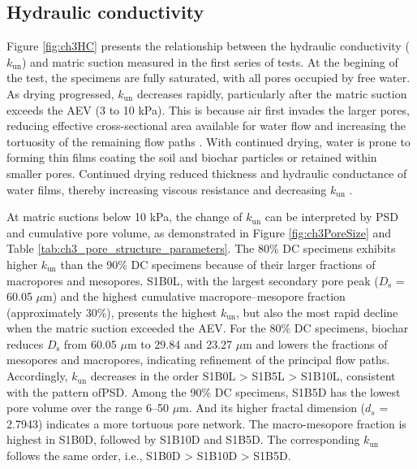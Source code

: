 \subsection{Hydraulic conductivity}
Figure \ref{fig:ch3HC} presents the relationship between the hydraulic conductivity ($k_{\mathrm{un}}$) and matric suction measured in the first series of tests. At the begining of the test, the specimens are fully saturated, with all pores occupied by free water. As drying progressed, $k_{\mathrm{un}}$ decreases rapidly, particularly after the matric suction exceeds the \ac{AEV} (3 to 10 kPa). This is because air first invades the larger pores, reducing effective cross-sectional area available for water flow and increasing the tortuosity of the remaining flow paths \parencite{vangenuchtenClosedformEquationPredicting1980,fredlundPredictingPermeabilityFunction1994}. With continued drying, water is prone to forming thin films coating the soil and biochar particles or retained within smaller pores. Continued drying reduced thickness and hydraulic conductance of water films, thereby increasing viscous resistance and decreasing $k_{\mathrm{un}}$ \parencite{tullerHydraulicConductivityVariably2001}.\par
At matric suctions below 10 kPa, the change of $k_{\mathrm{un}}$ can be interpreted by \ac{PSD} and cumulative pore volume, as demonstrated in Figure \ref{fig:ch3PoreSize} and Table \ref{tab:ch3_pore_structure_parameters}. The 80\% \ac{DC} specimens exhibits higher $k_{\mathrm{un}}$ than the 90\% \ac{DC} specimens because of their larger fractions of macropores and mesopores. S1B0L, with the largest secondary pore peak ($D_{\mathrm{s}}$ = 60.05 $\mu\mathrm{m}$) and the highest cumulative macropore–mesopore fraction (approximately 30\%), presents the highest $k_{\mathrm{un}}$, but also the most rapid decline when the matric suction exceeded the \ac{AEV}. For the 80\% \ac{DC} specimens, biochar reduces $D_{\mathrm{s}}$ from 60.05 $\mu\mathrm{m}$ to 29.84 and 23.27 $\mu\mathrm{m}$ and lowers the fractions of mesopores and macropores, indicating refinement of the principal flow paths. Accordingly, $k_{\mathrm{un}}$ decreases in the order S1B0L > S1B5L > S1B10L, consistent with the pattern of\ac{PSD}. Among the 90\% \ac{DC} specimens, S1B5D has the lowest pore volume over the range 6–50 $\mu\mathrm{m}$. And its higher fractal dimension ($d_{s}$ = 2.7943) indicates a more tortuous pore network. The macro-mesopore fraction is highest in S1B0D, followed by S1B10D and S1B5D. The corresponding $k_{\mathrm{un}}$ follows the same order, i.e., S1B0D > S1B10D > S1B5D.\par
